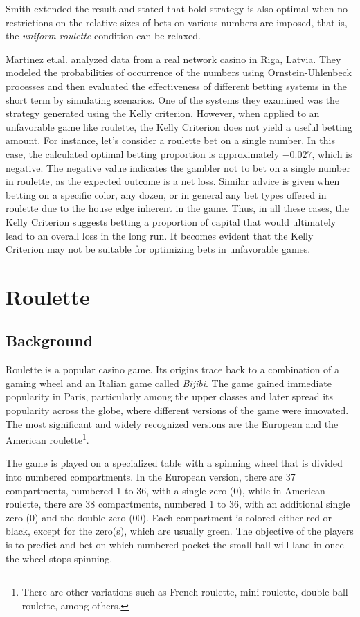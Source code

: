 \documentclass[11pt,twoside]{article}
\numberwithin{Theorem}{section}
\numberwithin{Definition}{section}
\numberwithin{Lemma}{section}
\numberwithin{Algorithm}{section}
\numberwithin{equation}{section}
\begin{document}
Smith\cite{Smith} extended the result and stated that bold strategy is also optimal when no restrictions on the relative sizes of bets on various numbers are imposed, that is, the \textit{uniform roulette} condition can be relaxed.

Martinez et.al.\cite{martínez2016} analyzed data from a real network casino in Riga, Latvia. They modeled the probabilities of occurrence of the numbers using Ornstein-Uhlenbeck processes and then evaluated the effectiveness of different betting systems in the short term by simulating scenarios. One of the systems they examined was the strategy generated using the Kelly criterion. However, when applied to an unfavorable game like roulette, the Kelly Criterion does not yield a useful betting amount. For instance, let's consider a roulette bet on a single number. In this case, the calculated optimal betting proportion is approximately $-0.027$, which is negative. The negative value indicates the gambler not to bet on a single number in roulette, as the expected outcome is a net loss. Similar advice is given when betting on a specific color, any dozen, or in general any bet types offered in roulette due to the house edge inherent in the game. Thus, in all these cases, the Kelly Criterion suggests betting a proportion of capital that would ultimately lead to an overall loss in the long run. It becomes evident that the Kelly Criterion may not be suitable for optimizing bets in unfavorable games.


\clearpage
\section{Roulette} \label{Roulette}
\subsection{Background}
Roulette is a popular casino game. Its origins trace back to a combination of a gaming wheel and an Italian game called \textit{Bijibi}. The game gained immediate popularity in Paris, particularly among the upper classes and later spread its popularity across the globe, where different versions of the game were innovated. The most significant and widely recognized versions are the European and the American roulette\footnote{There are other variations such as French roulette, mini roulette, double ball roulette, among others.}.

The game is played on a specialized table with a spinning wheel that is divided into numbered compartments. In the European version, there are 37 compartments, numbered 1 to 36, with a single zero (0), while in American roulette, there are 38 compartments, numbered 1 to 36, with an additional single zero (0) and the double zero (00). Each compartment is colored either red or black, except for the zero(s), which are usually green. The objective of the players is to predict and bet on which numbered pocket the small ball will land in once the wheel stops spinning.
\end{document}
